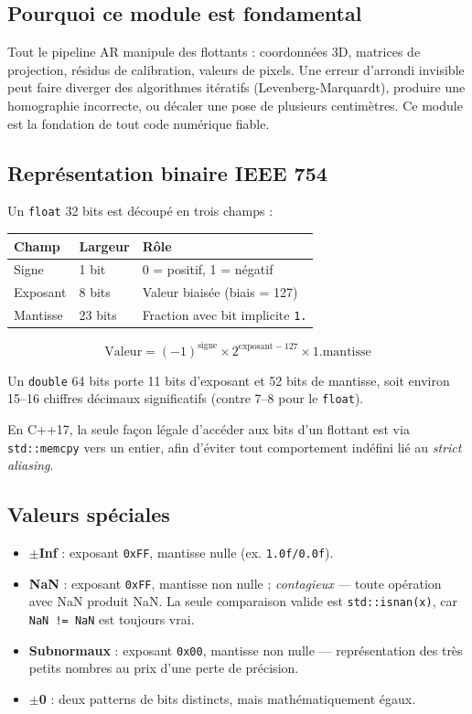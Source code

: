 \documentclass[11pt,a4paper]{article}
\begin{document}
\subsection{Pourquoi ce module est fondamental}
Tout le pipeline AR manipule des flottants : coordonnées 3D, matrices de projection, résidus de
calibration, valeurs de pixels. Une erreur d'arrondi invisible peut faire diverger des algorithmes
itératifs (Levenberg-Marquardt), produire une homographie incorrecte, ou décaler une pose de
plusieurs centimètres. Ce module est la fondation de tout code numérique fiable.

\subsection{Représentation binaire IEEE 754}
Un \texttt{float} 32 bits est découpé en trois champs :

\begin{center}
\begin{tabular}{lll}
  \toprule
  \textbf{Champ} & \textbf{Largeur} & \textbf{Rôle} \\
  \midrule
  Signe    & 1 bit   & 0 = positif, 1 = négatif \\
  Exposant & 8 bits  & Valeur biaisée (biais = 127) \\
  Mantisse & 23 bits & Fraction avec bit implicite \texttt{1.} \\
  \bottomrule
\end{tabular}
\end{center}

\[
  \text{Valeur} = (-1)^{\text{signe}} \times 2^{\text{exposant} - 127} \times 1.\text{mantisse}
\]

Un \texttt{double} 64 bits porte 11 bits d'exposant et 52 bits de mantisse, soit environ 15–16 chiffres
décimaux significatifs (contre 7–8 pour le \texttt{float}).

En C++17, la seule façon légale d'accéder aux bits d'un flottant est via \texttt{std::memcpy} vers un
entier, afin d'éviter tout comportement indéfini lié au \textit{strict aliasing}.

\subsection{Valeurs spéciales}
\begin{itemize}[noitemsep]
  \item \textbf{$\pm$Inf} : exposant \texttt{0xFF}, mantisse nulle (ex. \texttt{1.0f/0.0f}).
  \item \textbf{NaN} : exposant \texttt{0xFF}, mantisse non nulle ; \textit{contagieux} — toute opération
        avec NaN produit NaN. La seule comparaison valide est \texttt{std::isnan(x)}, car \texttt{NaN != NaN} est toujours vrai.
  \item \textbf{Subnormaux} : exposant \texttt{0x00}, mantisse non nulle — représentation des très
        petits nombres au prix d'une perte de précision.
  \item \textbf{$\pm$0} : deux patterns de bits distincts, mais mathématiquement égaux.
\end{itemize}
\end{document}
